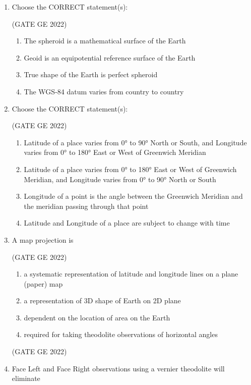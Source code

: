 \documentclass[journal,12pt,onecolumn]{IEEEtran}
\theoremstyle{remark}
\begin{document}
\begin{enumerate}
\item Choose the CORRECT statement(s):

\hfill (GATE GE 2022)

\begin{enumerate}
    \item The spheroid is a mathematical surface of the Earth
    \item Geoid is an equipotential reference surface of the Earth
    \item True shape of the Earth is perfect spheroid
    \item The WGS-84 datum varies from country to country
\end{enumerate}

\item Choose the CORRECT statement(s):

\hfill (GATE GE 2022)

\begin{enumerate}
    \item Latitude of a place varies from 0° to 90° North or South, and Longitude varies from 0° to 180° East or West of Greenwich Meridian
    \item Latitude of a place varies from 0° to 180° East or West of Greenwich Meridian, and Longitude varies from 0° to 90° North or South
    \item Longitude of a point is the angle between the Greenwich Meridian and the meridian passing through that point
    \item Latitude and Longitude of a place are subject to change with time
\end{enumerate}

\item A map projection is

\hfill (GATE GE 2022)

\begin{enumerate}
    \item a systematic representation of latitude and longitude lines on a plane (paper) map
    \item a representation of 3D shape of Earth on 2D plane
    \item dependent on the location of area on the Earth
    \item required for taking theodolite observations of horizontal angles
\end{enumerate}

\hfill (GATE GE 2022)

\item Face Left and Face Right observations using a vernier theodolite will eliminate


\end{enumerate}
\end{document}
